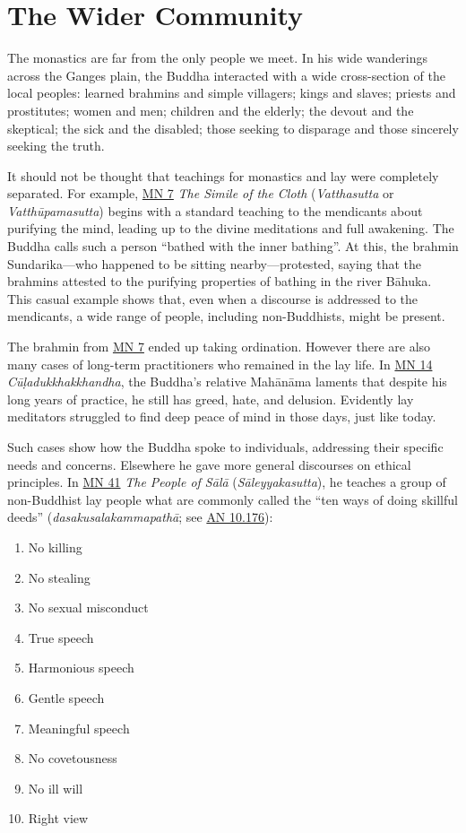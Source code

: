 \documentclass[12pt,openany]{book}%
\begin{document}
\section*{The Wider Community}

The monastics are far from the only people we meet. In his wide wanderings across the Ganges plain, the Buddha interacted with a wide cross-section of the local peoples: learned brahmins and simple villagers; kings and slaves; priests and prostitutes; women and men; children and the elderly; the devout and the skeptical; the sick and the disabled; those seeking to disparage and those sincerely seeking the truth.

It should not be thought that teachings for monastics and lay were completely separated. For example, \href{https://suttacentral.net/mn7}{MN 7} \textit{The Simile of the Cloth} (\textit{Vatthasutta} or \textit{\textsanskrit{Vatthūpamasutta}}) begins with a standard teaching to the mendicants about purifying the mind, leading up to the divine meditations and full awakening. The Buddha calls such a person “bathed with the inner bathing”. At this, the brahmin Sundarika—who happened to be sitting nearby—protested, saying that the brahmins attested to the purifying properties of bathing in the river \textsanskrit{Bāhuka}. This casual example shows that, even when a discourse is addressed to the mendicants, a wide range of people, including non-Buddhists, might be present.

The brahmin from \href{https://suttacentral.net/mn7}{MN 7} ended up taking ordination. However there are also many cases of long-term practitioners who remained in the lay life. In \href{https://suttacentral.net/mn14}{MN 14} \textit{\textsanskrit{Cūḷadukkhakkhandha}}, the Buddha’s relative \textsanskrit{Mahānāma} laments that despite his long years of practice, he still has greed, hate, and delusion. Evidently lay meditators struggled to find deep peace of mind in those days, just like today.

Such cases show how the Buddha spoke to individuals, addressing their specific needs and concerns. Elsewhere he gave more general discourses on ethical principles. In \href{https://suttacentral.net/mn41}{MN 41} \textit{The People of \textsanskrit{Sālā}} (\textit{\textsanskrit{Sāleyyakasutta}}), he teaches a group of non-Buddhist lay people what are commonly called the “ten ways of doing skillful deeds” (\textit{\textsanskrit{dasakusalakammapathā}}; see \href{https://suttacentral.net/an10.176}{AN 10.176}):

\begin{enumerate}%
\item No killing%
\item No stealing%
\item No sexual misconduct%
\item True speech%
\item Harmonious speech%
\item Gentle speech%
\item Meaningful speech%
\item No covetousness%
\item No ill will%
\item Right view%
\end{enumerate}
\end{document}
